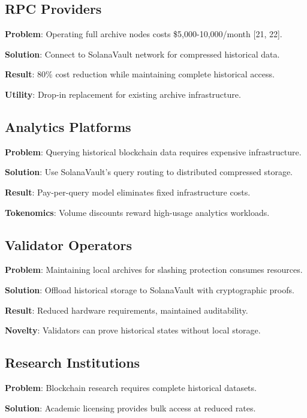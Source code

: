\documentclass[12pt,a4paper]{article}
\begin{document}
\subsection{RPC Providers}

\textbf{Problem}: Operating full archive nodes costs \$5,000-10,000/month [21, 22].

\textbf{Solution}: Connect to SolanaVault network for compressed historical data.

\textbf{Result}: 80\% cost reduction while maintaining complete historical access.

\noindent\textbf{Utility}: Drop-in replacement for existing archive infrastructure.

\subsection{Analytics Platforms}

\textbf{Problem}: Querying historical blockchain data requires expensive infrastructure.

\textbf{Solution}: Use SolanaVault's query routing to distributed compressed storage.

\textbf{Result}: Pay-per-query model eliminates fixed infrastructure costs.

\noindent\textbf{Tokenomics}: Volume discounts reward high-usage analytics workloads.

\subsection{Validator Operators}

\textbf{Problem}: Maintaining local archives for slashing protection consumes resources.

\textbf{Solution}: Offload historical storage to SolanaVault with cryptographic proofs.

\textbf{Result}: Reduced hardware requirements, maintained auditability.

\noindent\textbf{Novelty}: Validators can prove historical states without local storage.

\subsection{Research Institutions}

\textbf{Problem}: Blockchain research requires complete historical datasets.

\textbf{Solution}: Academic licensing provides bulk access at reduced rates.
\end{document}
